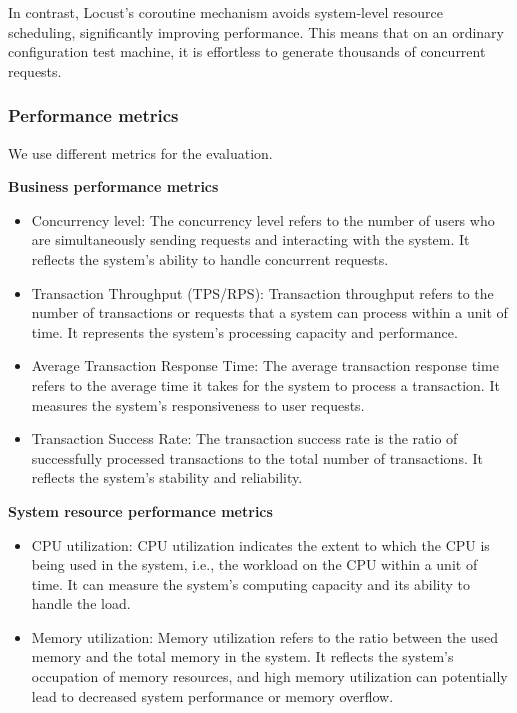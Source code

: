 \documentclass[journal]{IEEEtran}
\begin{document}
In contrast, Locust's coroutine mechanism avoids system-level resource scheduling, significantly improving performance. This means that on an ordinary configuration test machine, it is effortless to generate thousands of concurrent requests.


\subsubsection{Performance metrics} We use different metrics for the evaluation.

\textbf{Business performance metrics}
\begin{itemize}
  \item Concurrency level: The concurrency level refers to the number of users who are simultaneously sending requests and interacting with the system. It reflects the system's ability to handle concurrent requests.
  \item Transaction Throughput (TPS/RPS): Transaction throughput refers to the number of transactions or requests that a system can process within a unit of time. It represents the system's processing capacity and performance.
  \item Average Transaction Response Time: The average transaction response time refers to the average time it takes for the system to process a transaction. It measures the system's responsiveness to user requests.
  \item Transaction Success Rate: The transaction success rate is the ratio of successfully processed transactions to the total number of transactions. It reflects the system's stability and reliability.
\end{itemize}

\textbf{System resource performance metrics}
\begin{itemize}
  \item CPU utilization: CPU utilization indicates the extent to which the CPU is being used in the system, i.e., the workload on the CPU within a unit of time. It can measure the system's computing capacity and its ability to handle the load.
  \item Memory utilization: Memory utilization refers to the ratio between the used memory and the total memory in the system. It reflects the system's occupation of memory resources, and high memory utilization can potentially lead to decreased system performance or memory overflow.
\end{itemize}
\end{document}
